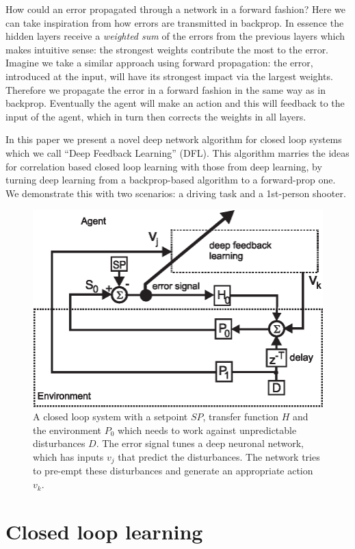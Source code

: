 \documentclass{llncs}
\begin{document}
How could an error propagated through a network in a forward fashion? Here we can
take inspiration from how errors are transmitted in backprop. 
In essence the hidden layers receive a \textsl{weighted sum} of the errors from the
previous layers which makes intuitive sense: the strongest weights
contribute the most to the error. Imagine we take a similar approach using forward propagation: the error, introduced at the input, will have its strongest
impact via the largest weights. Therefore we propagate the error
in a forward fashion in the same way as in backprop. Eventually the agent
will make an action and this will feedback to the input of the agent, which
in turn then corrects the weights in all layers.

In this paper we present a novel deep network algorithm for closed loop systems
which we call ``Deep Feedback Learning'' (DFL). This algorithm marries the
ideas for correlation based closed loop learning with those from deep learning,
by turning deep learning from a backprop-based algorithm to a forward-prop
one. We demonstrate this with two scenarios: a driving task and a 1st-person shooter.

\begin{figure}[h!]
  \centering
  \includegraphics[width=0.75\columnwidth]{closed_loop}
  \caption{A closed loop system with a setpoint $SP$, transfer function $H$ and the
    environment $P_0$ which needs to work against unpredictable disturbances $D$.
    The error signal tunes a deep neuronal network, which has inputs
    $v_j$ that predict the disturbances. The network tries to pre-empt these
    disturbances and generate an appropriate action $v_k$.
    \label{closed_loop}}
\end{figure}

\section{Closed loop learning}
\end{document}
